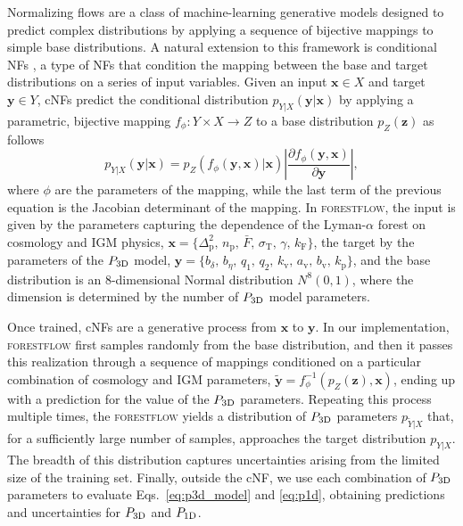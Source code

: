 \documentclass{aa}
\newcommand{\lyaf}{Lyman-$\alpha$ forest\xspace}
\newcommand{\poned}{\ensuremath{P_{\rm 1D}}\xspace}
\newcommand{\pthreed}{\ensuremath{P_{\rm 3D}}\xspace}
\newcommand{\forestflow}{\textsc{forestflow}\xspace}
\newcommand{\mflux}{\ensuremath{\bar{F}}\xspace}
\begin{document}
Normalizing flows \citep[NFs;][]{NF_Rezende2015} are a class of machine-learning generative models designed to predict complex distributions by applying a sequence of bijective mappings to simple base distributions. A natural extension to this framework is conditional NFs \citep[cNFs;][]{Winkler2019, cNF_Papamakarios}, a type of NFs that condition the mapping between the base and target distributions on a series of input variables. Given an input $\mathbf{x} \in X$ and target $\mathbf{y} \in Y$, cNFs predict the conditional distribution $p_{Y|X}(\mathbf{y}|\mathbf{x})$ by applying a parametric, bijective mapping $f_\phi: Y\times X \to Z$ to a base distribution $p_{Z}(\mathbf{z})$ as follows
%
\begin{equation}
    \label{eq:cNF_pdf}
    p_{Y|X}(\mathbf{y}|\mathbf{x}) = p_{Z}(f_\phi(\mathbf{y}, \mathbf{x})|\mathbf{x}) \left|\frac{\partial f_\phi(\mathbf{y}, \mathbf{x})}{\partial \mathbf{y}}\right|,
\end{equation}
%
where $\phi$ are the parameters of the mapping, while the last term of the previous equation is the Jacobian determinant of the mapping. In \forestflow, the input is given by the parameters capturing the dependence of the \lyaf on cosmology and IGM physics, $\mathbf{x}=\{\Delta_\mathrm{p}^2,\, n_\mathrm{p},\, \mflux,\, \sigma_\mathrm{T},\, \gamma,\, k_\mathrm{F}\}$, the target by the parameters of the \pthreed model, $\mathbf{y}=\{b_\delta,\, b_\eta,\, q_1,\, q_2,\, k_\mathrm{v},\, a_\mathrm{v},\, b_\mathrm{v}, \, k_\mathrm{p}\}$, and the base distribution is an 8-dimensional Normal distribution $N^8(0,1)$, where the dimension is determined by the number of \pthreed model parameters.

Once trained, cNFs are a generative process from $\mathbf{x}$ to $\mathbf{y}$. In our implementation, \forestflow first samples randomly from the base distribution, and then it passes this realization through a sequence of mappings conditioned on a particular combination of cosmology and IGM parameters, $\mathbf{\tilde{y}}=f_\phi^{-1}(p_{Z}(\mathbf{z}), \mathbf{x})$, ending up with a prediction for the value of the \pthreed parameters. Repeating this process multiple times, the \forestflow yields a distribution of \pthreed parameters $p_{\tilde{Y}|X}$ that, for a sufficiently large number of samples, approaches the target distribution $p_{Y|X}$. The breadth of this distribution captures uncertainties arising from the limited size of the training set. Finally, outside the cNF, we use each combination of \pthreed parameters to evaluate Eqs.~\ref{eq:p3d_model} and \ref{eq:p1d}, obtaining predictions and uncertainties for \pthreed and \poned.
\end{document}
